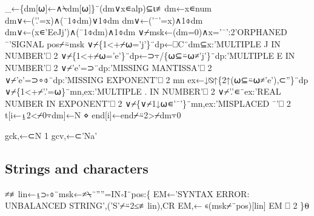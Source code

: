 \documentclass{article}%
\begin{document}
\nwenddocs{}\endmoddef\nwstartdeflinemarkup{}\nwenddeflinemarkup
_←\{dm[⍵]←∧⍀dm[⍵]\}¨(dm∨x∊alp)⊆⍳≢dm←x∊num
dm∨←('.'=x)∧(¯1⌽dm)∨1⌽dm
dm∨←('¯'=x)∧1⌽dm
dm∨←(x∊'EeJj')∧(¯1⌽dm)∧1⌽dm
∨⌿msk←(dm=0)∧x='¯':2'ORPHANED ¯'SIGNAL pos⌿⍨msk
∨⌿\{1<+⌿⍵='j'\}¨dp←⎕C¨dm⊆x:'MULTIPLE J IN NUMBER'⎕ 2
∨⌿\{1<+⌿⍵='e'\}¨dp←⊃⍪/\{⍵⊆⍨⍵≠'j'\}¨dp:'MULTIPLE E IN NUMBER'⎕ 2
∨⌿'e'=⊃¨dp:'MISSING MANTISSA'⎕ 2
∨⌿'e'=⊃∘⌽¨dp:'MISSING EXPONENT'⎕ 2
mn ex←↓⍉↑\{2↑(⍵⊆⍨⍵≠'e'),⊂''\}¨dp
∨⌿\{1<+⌿'.'=⍵\}¨mn,ex:'MULTIPLE . IN NUMBER'⎕ 2
∨⌿'.'∊¨ex:'REAL NUMBER IN EXPONENT'⎕ 2
∨⌿\{∨⌿1↓⍵∊'¯'\}¨mn,ex:'MISPLACED ¯'⎕ 2
t[i←⍸2<⌿0⍪dm]←N ⋄ end[i]←end⌿⍨2>⌿dm⍪0
\nwendcode{}\nwdocspar

\nwenddocs{}\plusendmoddef\nwstartdeflinemarkup{}\nwenddeflinemarkup
gck,←⊂N 1
gcv,←⊂'Na'
\nwendcode{}\nwdocspar

\subsection{Strings and characters}

\nwenddocs{}\endmoddef\nwstartdeflinemarkup{}≠≢lin←⍸⊃∘⌽¨msk←≠⍀¨''''=IN∘I¨pos:\{
        EM←'SYNTAX ERROR: UNBALANCED STRING',('S'⌿⍨2≤≢lin),CR
        EM,← ∊(msk⌿¨pos)[lin]
        EM ⎕ 2
\}⍬
\nwendcode{}\nwdocspar
\end{document}
